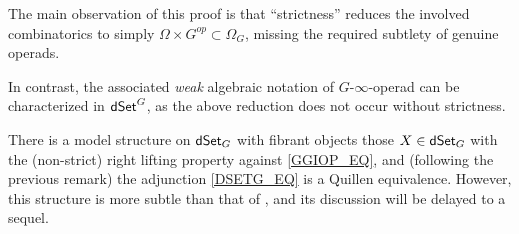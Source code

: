 \documentclass[a4paper,10pt
,draft
]{article}%
\begin{document}
The main observation of this proof is 
that ``strictness'' reduces the involved combinatorics to simply $\Omega \times G^{op} \subset \Omega_G$,
missing the required subtlety of genuine operads.

\begin{remark}
      In contrast, the associated \textit{weak} algebraic notation of $G$-$\infty$-operad
      can be characterized in $\mathsf{dSet}^G$, as the above reduction does not occur without strictness.
\end{remark}

\begin{remark}
      There is a model structure on $\mathsf{dSet}_G$ with fibrant objects
      those $X \in \mathsf{dSet}_G$ with the (non-strict) right lifting property against \eqref{GGIOP_EQ},
      and (following the previous remark) the adjunction \eqref{DSETG_EQ} is a Quillen equivalence.
      However, this structure is more subtle than that of \cite{Per17},
      and its discussion will be delayed to a sequel.
\end{remark}



























\end{document}
